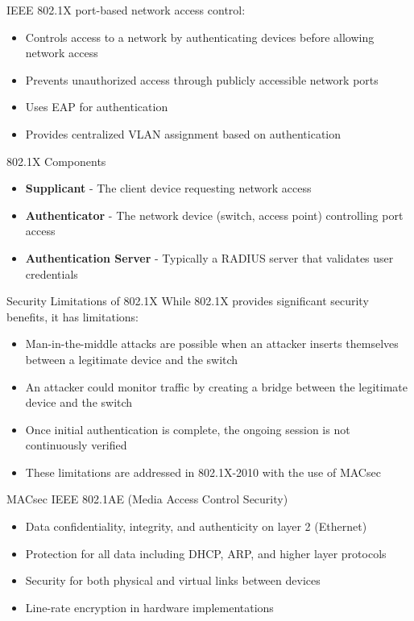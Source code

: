 \begin{definition}{IEEE 802.1X}
port-based network access control:
\begin{itemize}
    \item Controls access to a network by authenticating devices before allowing network access
    \item Prevents unauthorized access through publicly accessible network ports
    \item Uses EAP for authentication
    \item Provides centralized VLAN assignment based on authentication
\end{itemize}
\end{definition}

\begin{concept}{802.1X Components}
\begin{itemize}
    \item \textbf{Supplicant} - The client device requesting network access
    \item \textbf{Authenticator} - The network device (switch, access point) controlling port access
    \item \textbf{Authentication Server} - Typically a RADIUS server that validates user credentials
\end{itemize}
\end{concept}

\begin{theorem}{Security Limitations of 802.1X}
While 802.1X provides significant security benefits, it has limitations:
\begin{itemize}
    \item Man-in-the-middle attacks are possible when an attacker inserts themselves between a legitimate device and the switch
    \item An attacker could monitor traffic by creating a bridge between the legitimate device and the switch
    \item Once initial authentication is complete, the ongoing session is not continuously verified
    \item These limitations are addressed in 802.1X-2010 with the use of MACsec
\end{itemize}
\end{theorem}


\begin{definition}{MACsec}
IEEE 802.1AE (Media Access Control Security)
\begin{itemize}
    \item Data confidentiality, integrity, and authenticity on layer 2 (Ethernet)
    \item Protection for all data including DHCP, ARP, and higher layer protocols
    \item Security for both physical and virtual links between devices
    \item Line-rate encryption in hardware implementations
\end{itemize}
\end{definition}

